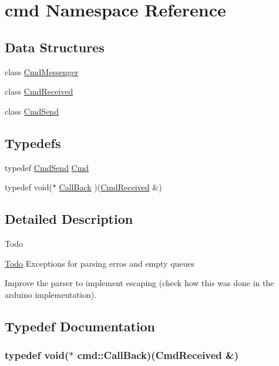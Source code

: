 \hypertarget{namespacecmd}{\section{cmd Namespace Reference}
\label{namespacecmd}
}
\subsection*{Data Structures}
\begin{DoxyCompactItemize}
\item 
class \hyperlink{classcmd_1_1_cmd_messenger}{Cmd\+Messenger}
\item 
class \hyperlink{classcmd_1_1_cmd_received}{Cmd\+Received}
\item 
class \hyperlink{classcmd_1_1_cmd_send}{Cmd\+Send}
\end{DoxyCompactItemize}
\subsection*{Typedefs}
\begin{DoxyCompactItemize}
\item 
typedef \hyperlink{classcmd_1_1_cmd_send}{Cmd\+Send} \hyperlink{namespacecmd_af9b58ca395c80edd1335e21d1b9f4c99}{Cmd}
\item 
typedef void($\ast$ \hyperlink{namespacecmd_a20b40ecd3ba46130eef6c125f70c4121}{Call\+Back} )(\hyperlink{classcmd_1_1_cmd_received}{Cmd\+Received} \&)
\end{DoxyCompactItemize}


\subsection{Detailed Description}
\begin{DoxyRefDesc}{Todo}
\item[\hyperlink{todo__todo000003}{Todo}]Exceptions for parsing erros and empty queues 

Improve the parser to implement escaping (check how this was done in the arduino implementation). \end{DoxyRefDesc}


\subsection{Typedef Documentation}
\hypertarget{namespacecmd_a20b40ecd3ba46130eef6c125f70c4121}{
\subsubsection[{Call\+Back}]{\setlength{\rightskip}{0pt plus 5cm}typedef void($\ast$ cmd\+::\+Call\+Back)({\bf Cmd\+Received} \&)}}\label{namespacecmd_a20b40ecd3ba46130eef6c125f70c4121}


